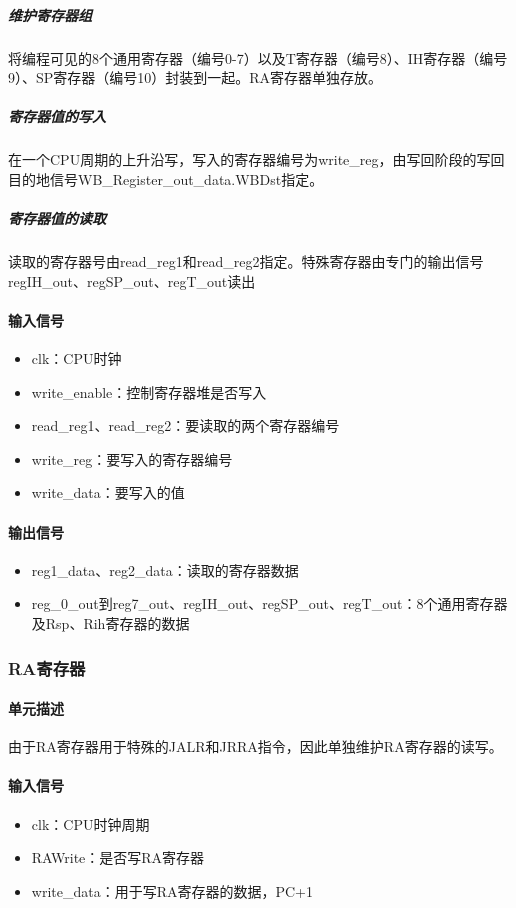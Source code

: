 \documentclass{article}
\begin{document}
\subparagraph{维护寄存器组}
将编程可见的8个通用寄存器（编号0-7）以及T寄存器（编号8）、IH寄存器（编号9）、SP寄存器（编号10）封装到一起。RA寄存器单独存放。
\subparagraph{寄存器值的写入}
在一个CPU周期的上升沿写，写入的寄存器编号为write\_reg，由写回阶段的写回目的地信号WB\_Register\_out\_data.WBDst指定。
\subparagraph{寄存器值的读取}
读取的寄存器号由read\_reg1和read\_reg2指定。特殊寄存器由专门的输出信号regIH\_out、regSP\_out、regT\_out读出

\paragraph{输入信号}
\begin{itemize}
	\item clk：CPU时钟
	\item write\_enable：控制寄存器堆是否写入 
	\item read\_reg1、read\_reg2：要读取的两个寄存器编号
	\item write\_reg：要写入的寄存器编号 
	\item write\_data：要写入的值
\end{itemize}

\paragraph{输出信号}
\begin{itemize}
	\item reg1\_data、reg2\_data：读取的寄存器数据
	\item reg\_0\_out到reg7\_out、regIH\_out、regSP\_out、regT\_out：8个通用寄存器及Rsp、Rih寄存器的数据 
\end{itemize}

\subsubsection{RA寄存器}

\paragraph{单元描述}
由于RA寄存器用于特殊的JALR和JRRA指令，因此单独维护RA寄存器的读写。

\paragraph{输入信号}
\begin{itemize}
	\item clk：CPU时钟周期
	\item RAWrite：是否写RA寄存器 
	\item write\_data：用于写RA寄存器的数据，PC+1
\end{itemize}
\end{document}
